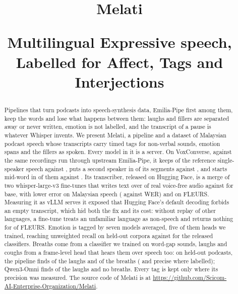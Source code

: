 \documentclass[10pt]{article}
\title{Melati\\[6pt]{\fontsize{11.5}{15}\selectfont\mdseries\color{scText}\textbf{M}ultilingual \textbf{E}xpressive speech, \textbf{L}abelled for \textbf{A}ffect, \textbf{T}ags and \textbf{I}nterjections\par}}
\begin{document}
\maketitle

\begin{abstract}
Pipelines that turn podcasts into speech-synthesis data, Emilia-Pipe first among them, keep the words and lose
what happens between them: laughs and fillers are separated away or never written, emotion is not labelled, and
the transcript of a pause is whatever Whisper invents. We present Melati, a pipeline and a dataset of Malaysian
podcast speech whose transcripts carry timed tags for non-verbal sounds, emotion spans and the fillers as spoken.
Every model in it is a server. On VoxConverse, against the same recordings run through upstream Emilia-Pipe, it
keeps  of the reference single-speaker speech against , puts a
second speaker in  of its segments against , and starts mid-word
in  of them against . Its transcriber, released on Hugging Face, is a merge
of two whisper-large-v3 fine-tunes that writes text over  of real voice-free audio
against  for base, with lower error on Malaysian speech (
against  WER) and on FLEURS. Measuring it as vLLM serves it exposed that Hugging Face's
default decoding forbids an empty transcript, which hid both the fix and its cost: without replay of other
languages, a fine-tune treats an unfamiliar language as non-speech and returns nothing for
 of FLEURS. Emotion is tagged by seven models averaged, five of them heads we trained,
reaching  unweighted recall on held-out corpora against  for the released
classifiers. Breaths come from a classifier we trained on word-gap sounds, laughs and coughs from a frame-level
head that hears them over speech too: on held-out podcasts, the pipeline finds
 of the laughs and  of the breaths
( and  precise where labelled); Qwen3-Omni finds
 of the laughs and no breaths. Every tag is kept only where its precision was measured. The source code of Melati is at
\url{https://github.com/Scicom-AI-Enterprise-Organization/Melati}.
\end{abstract}
\end{document}
